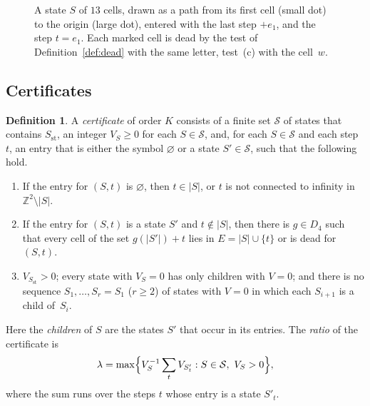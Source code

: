 \documentclass[11pt]{amsart}
\theoremstyle{definition}
\newtheorem{definition}[theorem]{Definition}
\theoremstyle{remark}
\numberwithin{equation}{section}
\newcommand{\Z}{\mathbb{Z}}
\begin{document}
\begin{figure}[ht]
\centering
{}
\caption{A state $S$ of $13$ cells, drawn as a path from its first cell (small dot) to the origin (large dot), entered with the last step $+e_1$, and the step $t=e_1$. Each marked cell is dead by the test of Definition~\ref{def:dead} with the same letter, test~(c) with the cell~$w$.}\label{fig:dead}
\end{figure}

\subsection{Certificates}
\begin{definition}\label{def:cert}
A \emph{certificate} of order $K$ consists of a finite set $\mathcal S$ of states that contains $S_\mathrm{st}$, an integer $V_S\ge0$ for each $S\in\mathcal S$, and, for each $S\in\mathcal S$ and each step $t$, an entry that is either the symbol $\varnothing$ or a state $S'\in\mathcal S$, such that the following hold.
\begin{enumerate}[label=(C\arabic*)]
\item If the entry for $(S,t)$ is $\varnothing$, then $t\in|S|$, or $t$ is not connected to infinity in $\Z^2\setminus|S|$.
\item If the entry for $(S,t)$ is a state $S'$ and $t\notin|S|$, then there is $g\in D_4$ such that every cell of the set $g(|S'|)+t$ lies in $E=|S|\cup\{t\}$ or is dead for $(S,t)$.
\item $V_{S_\mathrm{st}}>0$; every state with $V_S=0$ has only children with $V=0$; and there is no sequence $S_1,\dots,S_r=S_1$ ($r\ge2$) of states with $V=0$ in which each $S_{i+1}$ is a child of~$S_i$.
\end{enumerate}
Here the \emph{children} of $S$ are the states $S'$ that occur in its entries. The \emph{ratio} of the certificate is
\[
\lambda=\max\Bigl\{V_S^{-1}\sum_tV_{S'_t}:S\in\mathcal S,\ V_S>0\Bigr\},
\]
where the sum runs over the steps $t$ whose entry is a state $S'_t$.
\end{definition}
\end{document}
